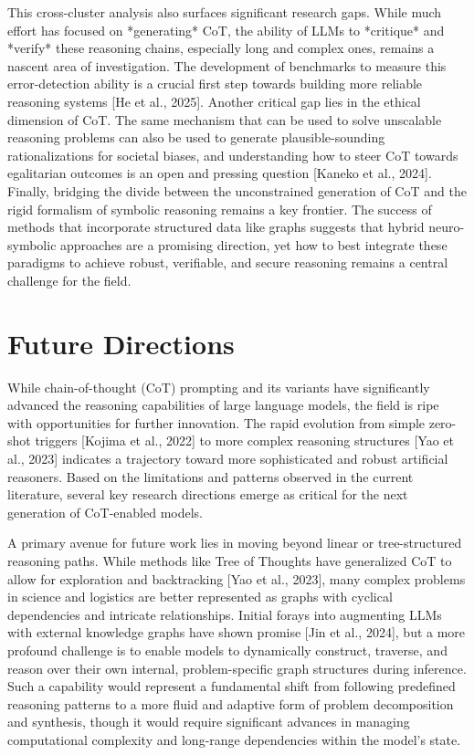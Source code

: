 \documentclass[11pt]{article}
\begin{document}
This cross-cluster analysis also surfaces significant research gaps. While much effort has focused on *generating* CoT, the ability of LLMs to *critique* and *verify* these reasoning chains, especially long and complex ones, remains a nascent area of investigation. The development of benchmarks to measure this error-detection ability is a crucial first step towards building more reliable reasoning systems [He et al., 2025]. Another critical gap lies in the ethical dimension of CoT. The same mechanism that can be used to solve unscalable reasoning problems can also be used to generate plausible-sounding rationalizations for societal biases, and understanding how to steer CoT towards egalitarian outcomes is an open and pressing question [Kaneko et al., 2024]. Finally, bridging the divide between the unconstrained generation of CoT and the rigid formalism of symbolic reasoning remains a key frontier. The success of methods that incorporate structured data like graphs suggests that hybrid neuro-symbolic approaches are a promising direction, yet how to best integrate these paradigms to achieve robust, verifiable, and secure reasoning remains a central challenge for the field.

\section{Future Directions}
While chain-of-thought (CoT) prompting and its variants have significantly advanced the reasoning capabilities of large language models, the field is ripe with opportunities for further innovation. The rapid evolution from simple zero-shot triggers [Kojima et al., 2022] to more complex reasoning structures [Yao et al., 2023] indicates a trajectory toward more sophisticated and robust artificial reasoners. Based on the limitations and patterns observed in the current literature, several key research directions emerge as critical for the next generation of CoT-enabled models.

A primary avenue for future work lies in moving beyond linear or tree-structured reasoning paths. While methods like Tree of Thoughts have generalized CoT to allow for exploration and backtracking [Yao et al., 2023], many complex problems in science and logistics are better represented as graphs with cyclical dependencies and intricate relationships. Initial forays into augmenting LLMs with external knowledge graphs have shown promise [Jin et al., 2024], but a more profound challenge is to enable models to dynamically construct, traverse, and reason over their own internal, problem-specific graph structures during inference. Such a capability would represent a fundamental shift from following predefined reasoning patterns to a more fluid and adaptive form of problem decomposition and synthesis, though it would require significant advances in managing computational complexity and long-range dependencies within the model's state.
\end{document}
